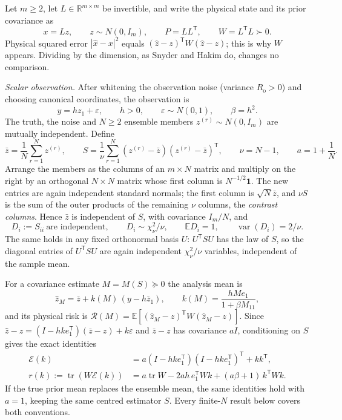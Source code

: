 \documentclass[11pt,a4paper]{article}
\numberwithin{equation}{section}
\theoremstyle{remark}\newtheorem{remark}[theorem]{Remark}
\newcommand{\E}{\mathbb E}
\newcommand{\R}{\mathbb R}
\newcommand{\tr}{\operatorname{tr}}
\newcommand{\var}{\operatorname{var}}
\newcommand{\risk}{\mathcal R}
\newcommand{\T}{^{\mathsf T}}
\newcommand{\Rn}{R_{\mathrm o}}
\begin{document}
Let \(m\ge2\), let \(L\in\R^{m\times m}\) be invertible, and write the physical state and
its prior covariance as
\[
 x=Lz,\qquad z\sim N(0,I_m),\qquad P=LL\T,\qquad W=L\T L\succ0 .
\]
Physical squared error \(|\hat x-x|^2\) equals \((\hat z-z)\T W(\hat z-z)\); this is why \(W\)
appears. Dividing by the dimension, as Snyder and Hakim do, changes no comparison.

\emph{Scalar observation.} After whitening the observation noise (variance \(\Rn>0\)) and
choosing canonical coordinates, the observation is
\[
 y=hz_1+\varepsilon,\qquad h>0,\qquad \varepsilon\sim N(0,1),\qquad \beta=h^2 .
\]
The truth, the noise and \(N\ge2\) ensemble members \(z^{(r)}\sim N(0,I_m)\) are mutually
independent. Define
\[
 \bar z=\frac1N\sum_{r=1}^N z^{(r)},\qquad
 S=\frac1{\nu}\sum_{r=1}^N(z^{(r)}-\bar z)(z^{(r)}-\bar z)\T,
 \qquad \nu=N-1,\qquad a=1+\frac1N .
\]
Arrange the members as the columns of an \(m\times N\) matrix and multiply on the right by an
orthogonal \(N\times N\) matrix whose first column is \(N^{-1/2}\mathbf 1\). The new entries
are again independent standard normals; the first column is \(\sqrt N\bar z\), and \(\nu S\) is
the sum of the outer products of the remaining \(\nu\) columns, the \emph{contrast columns}.
Hence \(\bar z\) is independent of \(S\), with covariance \(I_m/N\), and
\[
 D_i:=S_{ii}\ \text{are independent},\qquad D_i\sim\chi^2_\nu/\nu,\qquad \E D_i=1,\qquad
 \var(D_i)=2/\nu .
\]
The same holds in any fixed orthonormal basis \(U\): \(U\T SU\) has the law of \(S\), so the
diagonal entries of \(U\T SU\) are again independent \(\chi^2_\nu/\nu\) variables, independent
of the sample mean.

For a covariance estimate \(M=M(S)\succeq0\) the analysis mean is
\begin{equation}\label{eq:gain}
 \widehat z_M=\bar z+k(M)\,(y-h\bar z_1),\qquad
 k(M)=\frac{hMe_1}{1+\beta M_{11}} ,
\end{equation}
and its physical risk is \(\risk(M)=\E[(\widehat z_M-z)\T W(\widehat z_M-z)]\). Since
\(\widehat z-z=(I-hke_1\T)(\bar z-z)+k\varepsilon\) and \(\bar z-z\) has covariance \(aI\),
conditioning on \(S\) gives the exact identities
\begin{align}
 \mathcal E(k)&=a(I-hke_1\T)(I-hke_1\T)\T+kk\T,\label{eq:cov}\\
 r(k):=\tr(W\mathcal E(k))&=a\tr W-2ah\,e_1\T Wk+(a\beta+1)\,k\T Wk.\label{eq:risk}
\end{align}
If the true prior mean replaces the ensemble mean, the same identities hold with \(a=1\),
keeping the same centred estimator \(S\). Every finite-\(N\) result below covers both
conventions.
\end{document}
